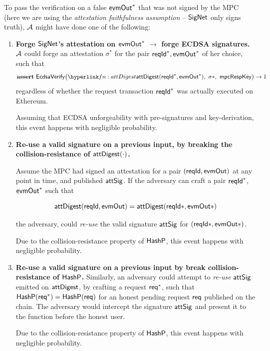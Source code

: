 To pass the verification on a false  $\mathsf{evmOut}^*$ that was  not signed by the MPC (here we are using the \emph{attestation faithfulness assumption} --  $\mathsf{SigNet}$ only signs truth), $\mathcal{A}$ might have done one of the following:
\begin{enumerate}

     \item \textbf{Forge $\mathsf{SigNet}$'s  attestation on $\mathsf{evmOut}^*$ $\rightarrow$  forge ECDSA signatures.}  $\mathcal{A}$ could  forge an attestation $\sigma^*$  for the pair $\mathsf{reqId}^*,\mathsf{evmOut}^*$ of her choice, such that
    $$\assert \EcdsaVf\bigl(\lnk{fn:attDigest}{\attDigest(\rid^*, \evmOut^*)}\bc \sigma*\bc \mpcRespKey\bigr) \rightarrow 1$$
 regardless of whether the request transaction  $\mathsf{reqId}^*$ was actually executed on Ethereum.

  Assuming that ECDSA unforgeability with pre-signatures and key-derivation, this event happens with   negligible probability.



    \item \textbf{Re-use a valid signature on a previous input, by breaking the collision-resistance of $\mathsf{attDigest}(\cdot)$.}

    Assume the MPC had signed an attestation for a pair $(\mathsf{reqId},\mathsf{evmOut})$ at any point in time, and published  $\mathsf{attSig}$.
    If the adversary can craft a pair  $\mathsf{reqId}^*$, $\mathsf{evmOut}^*$ such that

      $$\mathsf{attDigest}(\mathsf{reqId}, \mathsf{evmOut}) =\mathsf{attDigest}(\mathsf{reqId}*, \mathsf{evmOut}*) $$


      the adversary, could   \emph{re-use}  the  valid signature $\mathsf{attSig}$ for  $(\mathsf{reqId}*, \mathsf{evmOut}*)$.

      Due to the collision-resistance property of $\mathsf{HashP}$, this event happens with negligible probability.

     \item \textbf{Re-use a valid signature on a previous input by break collision-resistance of $\mathsf{HashP}$.}
       Similarly,  an adversary could attempt to  \emph{re-use} $\mathsf{attSig}$ emitted on   $\mathsf{attDigest}$, by crafting a request $\mathsf{req}^*$, such that $\mathsf{HashP}(\mathsf{req}^*) = \mathsf{HashP}(\mathsf{req})$ for an honest pending request $\mathsf{req}$ published  on the chain.
       The adversary would intercept the signature $\mathsf{attSig}$ and present it to the  function before the honest user.

        Due to the collision-resistance property of $\mathsf{HashP}$, this event happens with negligible probability.


\end{enumerate}


